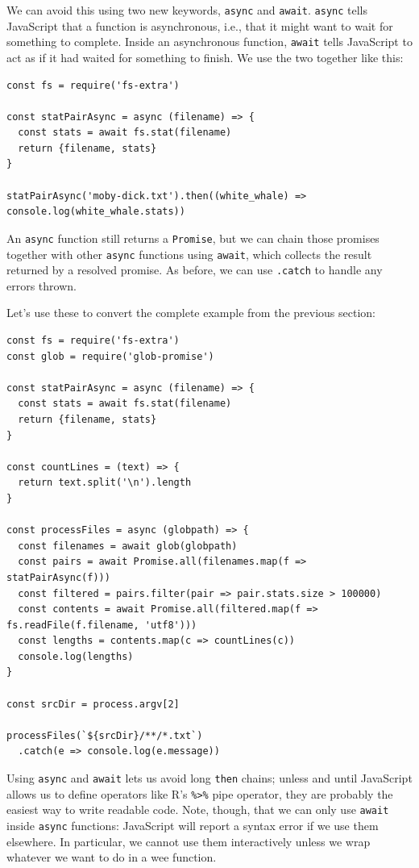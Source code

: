 We can avoid this using two new keywords, \texttt{async} and
\texttt{await}. \texttt{async} tells JavaScript that a function is
asynchronous, i.e., that it might want to wait for something to
complete. Inside an asynchronous function, \texttt{await} tells
JavaScript to act as if it had waited for something to finish. We use
the two together like this:

\begin{verbatim}
const fs = require('fs-extra')

const statPairAsync = async (filename) => {
  const stats = await fs.stat(filename)
  return {filename, stats}
}

statPairAsync('moby-dick.txt').then((white_whale) => console.log(white_whale.stats))
\end{verbatim}

An \texttt{async} function still returns a \texttt{Promise}, but we can
chain those promises together with other \texttt{async} functions using
\texttt{await}, which collects the result returned by a resolved
promise. As before, we can use \texttt{.catch} to handle any errors
thrown.

Let's use these to convert the complete example from the previous
section:

\begin{verbatim}
const fs = require('fs-extra')
const glob = require('glob-promise')

const statPairAsync = async (filename) => {
  const stats = await fs.stat(filename)
  return {filename, stats}
}

const countLines = (text) => {
  return text.split('\n').length
}

const processFiles = async (globpath) => {
  const filenames = await glob(globpath)
  const pairs = await Promise.all(filenames.map(f => statPairAsync(f)))
  const filtered = pairs.filter(pair => pair.stats.size > 100000)
  const contents = await Promise.all(filtered.map(f => fs.readFile(f.filename, 'utf8')))
  const lengths = contents.map(c => countLines(c))
  console.log(lengths)
}

const srcDir = process.argv[2]

processFiles(`${srcDir}/**/*.txt`)
  .catch(e => console.log(e.message))
\end{verbatim}

Using \texttt{async} and \texttt{await} lets us avoid long \texttt{then}
chains; unless and until JavaScript allows us to define operators like
R's \texttt{\%\textgreater{}\%} pipe operator, they are probably the
easiest way to write readable code. Note, though, that we can only use
\texttt{await} inside \texttt{async} functions: JavaScript will report a
syntax error if we use them elsewhere. In particular, we cannot use them
interactively unless we wrap whatever we want to do in a wee function.

